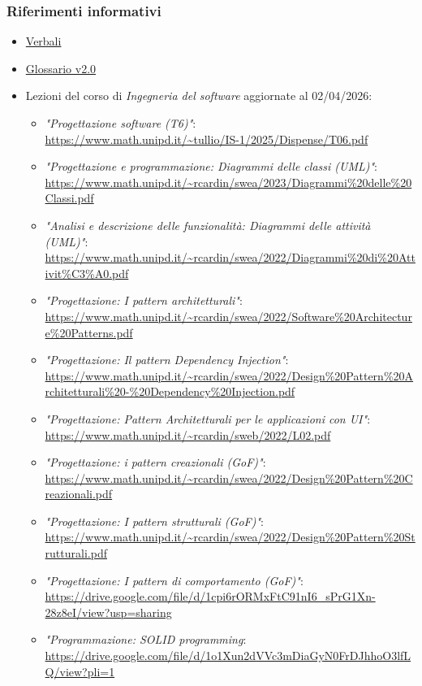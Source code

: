 \documentclass[a4paper,10pt]{article}
\begin{document}
\subsubsection{Riferimenti informativi}
\begin{itemize}
  \item \href{https://tool-8.github.io/Documentazione-SWE/}{Verbali}
  \item \href{https://tool-8.github.io/Documentazione-SWE/glossario/Glossario.pdf}{Glossario v2.0}
  \item Lezioni del corso di \textit{Ingegneria del software} aggiornate al 02/04/2026:
  \begin{itemize}
    \item \textit{"Progettazione software (T6)"}: \\ \url{https://www.math.unipd.it/~tullio/IS-1/2025/Dispense/T06.pdf}
    \item \textit{"Progettazione e programmazione: Diagrammi delle classi (UML)"}: \\ \url{https://www.math.unipd.it/~rcardin/swea/2023/Diagrammi%20delle%20Classi.pdf}
    \item \textit{"Analisi e descrizione delle funzionalità: Diagrammi delle attività (UML)"}: \\ \url{https://www.math.unipd.it/~rcardin/swea/2022/Diagrammi%20di%20Attivit%C3%A0.pdf}
    \item \textit{"Progettazione: I pattern architetturali"}: \\ \url{https://www.math.unipd.it/~rcardin/swea/2022/Software%20Architecture%20Patterns.pdf}
    \item \textit{"Progettazione: Il pattern Dependency Injection"}: \\ \url{https://www.math.unipd.it/~rcardin/swea/2022/Design%20Pattern%20Architetturali%20-%20Dependency%20Injection.pdf}
    \item \textit{"Progettazione: Pattern Architetturali per le applicazioni con UI"}: \\ \url{https://www.math.unipd.it/~rcardin/sweb/2022/L02.pdf}
    \item \textit{"Progettazione: i pattern creazionali (GoF)"}: \\ \url{https://www.math.unipd.it/~rcardin/swea/2022/Design%20Pattern%20Creazionali.pdf}
    \item \textit{"Progettazione: I pattern strutturali (GoF)"}: \\ \url{https://www.math.unipd.it/~rcardin/swea/2022/Design%20Pattern%20Strutturali.pdf}
    \item \textit{"Progettazione: I pattern di comportamento (GoF)"}: \\ \url{https://drive.google.com/file/d/1cpi6rORMxFtC91nI6_sPrG1Xn-28z8eI/view?usp=sharing}
    \item \textit{"Programmazione: SOLID programming}: \\ \url{https://drive.google.com/file/d/1o1Xun2dVVc3mDiaGyN0FrDJhhoO3lfLQ/view?pli=1}
  \end{itemize}
\end{itemize}
\end{document}
